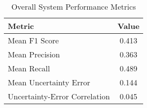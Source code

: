 \begin{table}[h]
\centering
\caption{Overall System Performance Metrics}
\label{tab:overall-performance}
\begin{tabular}{lc}
\toprule
\textbf{Metric} & \textbf{Value} \\
\midrule
Mean F1 Score & 0.413 \\
Mean Precision & 0.363 \\
Mean Recall & 0.489 \\
Mean Uncertainty Error & 0.144 \\
Uncertainty-Error Correlation & 0.045 \\
\bottomrule
\end{tabular}
\end{table}